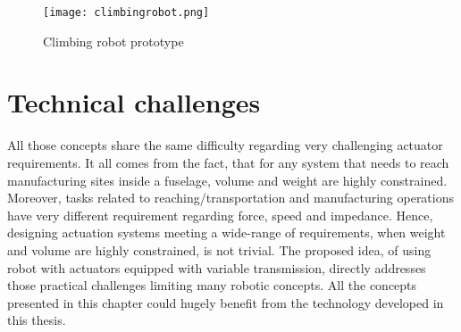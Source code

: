 \begin{figure}[htp]
	\centering
		\texttt{[image: climbingrobot.png]}
		\caption{Climbing robot prototype}
	\label{fig:climbingrobot_proto}
\end{figure}


\section{Technical challenges}

All those concepts share the same difficulty regarding very challenging actuator requirements. It all comes from the fact, that for any system that needs to reach manufacturing sites inside a fuselage, volume and weight are highly constrained. Moreover, tasks related to reaching/transportation and manufacturing operations have very different requirement regarding force, speed and impedance. Hence, designing actuation systems meeting a wide-range of requirements, when weight and volume are highly constrained, is not trivial. The proposed idea, of using robot with actuators equipped with variable transmission, directly addresses those practical challenges limiting many robotic concepts. All the concepts presented in this chapter could hugely benefit from the technology developed in this thesis. 